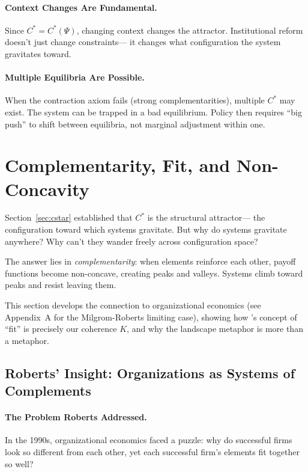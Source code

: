 \documentclass[12pt,a4paper]{article}
\begin{document}
\paragraph{Context Changes Are Fundamental.}
Since $C^* = C^*(\Psi)$, changing context changes the attractor.
Institutional reform doesn't just change constraints---
it changes what configuration the system gravitates toward.

\paragraph{Multiple Equilibria Are Possible.}
When the contraction axiom fails (strong complementarities),
multiple $C^*$ may exist. The system can be trapped in a bad equilibrium.
Policy then requires ``big push'' to shift between equilibria,
not marginal adjustment within one.

\section{Complementarity, Fit, and Non-Concavity}
\label{sec:roberts}

Section~\ref{sec:cstar} established that $C^*$ is the structural attractor---
the configuration toward which systems gravitate.
But why do systems gravitate anywhere? 
Why can't they wander freely across configuration space?

The answer lies in \emph{complementarity}: when elements reinforce each other,
payoff functions become non-concave, creating peaks and valleys.
Systems climb toward peaks and resist leaving them.

This section develops the connection to organizational economics (see Appendix~A for the Milgrom-Roberts limiting case),
showing how \citet{roberts2004}'s concept of ``fit'' is precisely our coherence $K$,
and why the landscape metaphor is more than a metaphor.

\subsection{Roberts' Insight: Organizations as Systems of Complements}

\paragraph{The Problem Roberts Addressed.}
In the 1990s, organizational economics faced a puzzle:
why do successful firms look so different from each other,
yet each successful firm's elements fit together so well?
\end{document}
